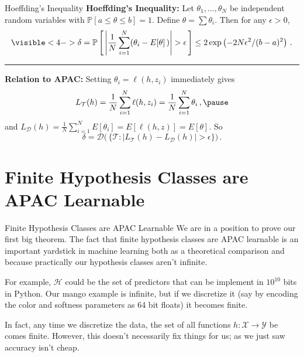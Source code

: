 \documentclass[10pt, table, dvipsnames,handout]{beamer}
\newcommand{\cT}{\ensuremath{\mathcal{T}}}
\newcommand{\cD}{\ensuremath{\mathcal{D}}}
\newcommand{\bP}{\ensuremath{\mathbb{P}}}
\begin{document}
\begin{frame}[fragile]{Hoeffding's Inequality}
\textbf{Hoeffding's Inequality:} Let $\theta_1,\ldots, \theta_N$ be independent random variables with $\bP[a\leq \theta\leq b] = 1$. Define $\theta = \sum \theta_i$. Then for any $\epsilon>0$, 
$$
\visible<4->{\delta} = \bP\left[\, \left|\frac{1}{N} \sum_{i=1}^N(\theta_i - E[\theta]\,)\right|>\epsilon  \,\right]\leq 2\exp\left(-2N\epsilon^2/(b-a)^2\right)\,.
$$
\rule{\textwidth}{0.4pt}\pause

\textbf{Relation to APAC:} Setting $\theta_i = \ell(h,z_i)$ immediately gives 
$$
L_\cT(h) = \frac{1}{N} \sum_{i=1}^N \ell(h,z_i) =  \frac{1}{N} \sum_{i=1}^N \theta_i\,,\pause
$$ 
and $L_\cD(h) = \frac{1}{N} \sum_{i=1}^N E[\theta_i] = E[\ell(h,z)] = E[\theta]$. \pause So 
$$
\delta = \cD\Big(\,\big\{\mathcal{T}:|L_\cT(h) - L_\cD(h)|>\epsilon\big\}\Big)\,.
$$

\end{frame}





\section{Finite Hypothesis Classes are APAC Learnable}


\begin{frame}[fragile]{Finite Hypothesis Classes are APAC Learnable}
We are in a position to prove our first big theorem. The fact that finite hypothesis classes are APAC learnable is an important yardstick in machine learning both as a theoretical comparison and because practically our hypothesis classes aren't infinite.\newline\pause

For example, $\mathcal{H}$ could be the set of predictors that can be implement in $10^{10}$ bits in Python. Our mango example is infinite, but if we discretize it (say by encoding the color and softness parameters as 64 bit floats) it becomes finite. \pause\newline

In fact, any time we discretize the data, the set of all functions $h:\mathcal{X}\to\mathcal{Y}$ be comes finite. However, this doesn't necessarily fix things for us; as we just saw accuracy isn't cheap.
\end{frame}
\end{document}
